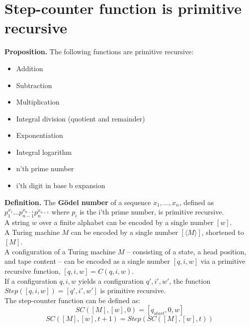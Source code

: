 \documentclass{article}
\begin{document}
\section{Step-counter function is primitive recursive}
\textbf{Proposition.} The following functions are primitive recursive:
\begin{itemize}
	\item Addition
	\item Subtraction
	\item Multiplication
	\item Integral division (quotient and remainder)
	\item Exponentiation
	\item Integral logarithm
	\item n'th prime number
	\item i'th digit in base b expansion
\end{itemize}
\textbf{Definition.} The \textbf{Gödel number} of a sequence $x_1, ..., x_n$, defined as $p_1^{x_1}...p_{n-1}^{x_{n-1}}p_n^{x_{n+1}}$ where $p_i$ is the i'th prime number, is primitive recursive.\bigskip
\\ A string $w$ over a finite alphabet can be encoded by a single number $[w]$.
\\ A Turing machine $M$ can be encoded by a single number $[\langle M\rangle]$, shortened to $[M]$.\bigskip
\\ A configuration of a Turing machine $M$ -- consisting of a state, a head position, and tape content -- can be encoded as a single number $[q, i, w]$ via a primitive recursive function, $[q, i, w] = C(q, i, w)$.
\\ If a configuration $q, i, w$ yields a configuration $q', i', w'$, the function $Step([q, i, w]) = [q', i', w']$ is primitive recursive.\bigskip
\\ The step-counter function can be defined as:
$$SC([M], [w], 0) = [q_{start}, 0, w]$$
$$SC([M], [w], t+1) = Step(SC([M], [w], t))$$
\end{document}

